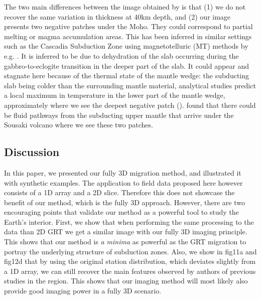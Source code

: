 \documentclass[10pt,a4paper]{article}
\numberwithin{equation}{section}
\begin{document}
The two main differences between the image obtained by \cite{pear_jgr_12} is that (1) we do not recover the same variation in thickness at 40km depth, and (2) our image presents two negative patches under the Moho.
They could correspond to partial melting or magma accumulation areas.
This has been inferred in similar settings such as the Cascadia Subduction Zone using magnetotelluric (MT) methods by e.g. \cite{wann_ggg_14}.
It is inferred to be due to dehydration of the slab occurring during the gabbro-to-eclogite transition in the deeper part of the slab.
It could appear and stagnate here because of the thermal state of the mantle wedge: the subducting slab being colder than the surrounding mantle material, analytical studies predict a local maximum in temperature in the lower part of the mantle wedge, approximately where we see the deepest negative patch (\cite{mcga_nat_14}).
\cite{gala_tphy_05} found that there could be fluid pathways from the subducting upper mantle that arrive under the Sousaki volcano where we see these two patches.


\subsection{Discussion}

In this paper, we presented our fully 3D migration method, and illustrated it with synthetic examples.
The application to field data proposed here however consists of a 1D array and a 2D slice.
Therefore this does not showcase the benefit of our method, which is the fully 3D approach.
However, there are two encouraging points that validate our method as a powerful tool to study the Earth’s interior.
First, we show that when performing the same processing to the data than 2D GRT we get a similar image with our fully 3D imaging principle.
This shows that our method is {\textit{a minima}} as powerful as the GRT migration to portray the underlying structure of subduction zones.
Also, we show in fig11a and fig12d that by using the original station distribution, which deviates slightly from a 1D array, we can still recover the main features observed by authors of previous studies in the region.
This shows that our imaging method will most likely also provide good imaging power in a fully 3D scenario.
\end{document}
